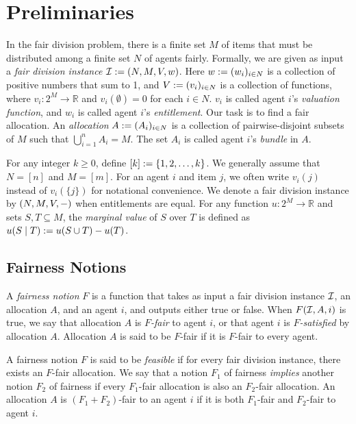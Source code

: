 \section{Preliminaries}
\label{sec:prelims}

In the fair division problem, there is a finite set $M$ of items
that must be distributed among a finite set $N$ of agents fairly.
Formally, we are given as input a \emph{fair division instance} $\mathcal{I} := (N,\allowbreak M,\allowbreak V,\allowbreak w)$.
Here $w := (w_i)_{i \in N}$ is a collection of positive numbers that sum to 1,
and $V := (v_i)_{i \in N}$ is a collection of functions,
where $v_i: 2^M \to \mathbb{R}$ and $v_i(\emptyset) = 0$ for each $i \in N$.
$v_i$ is called agent $i$'s \emph{valuation function},
and $w_i$ is called agent $i$'s \emph{entitlement}.
%
Our task is to find a fair allocation. An \emph{allocation} $A := (A_i)_{i \in N}$ is
a collection of pairwise-disjoint subsets of $M$ such that $\bigcup_{i=1}^n A_i = M$.
The set $A_i$ is called agent $i$'s \emph{bundle} in $A$.

For any integer $k \ge 0$, define $[k] := \{1, 2, \ldots, k\}$.
We generally assume \wLoG{} that $N = [n]$ and $M = [m]$.
For an agent $i$ and item $j$, we often write $v_i(j)$ instead of $v_i(\{j\})$ for notational convenience.
We denote a fair division instance by $(N,\allowbreak M,\allowbreak V,\allowbreak -)$ when entitlements are equal.
For any function $u: 2^M \to \mathbb{R}$ and sets $S, T \subseteq M$, the \emph{marginal value}
of $S$ over $T$ is defined as $u(S \mid T) := u(S \cup T) - u(T)$.

\subsection{Fairness Notions}
\label{sec:prelims:fairness-notions}

A \emph{fairness notion} $F$ is a function that takes as input a fair division instance $\mathcal{I}$,
an allocation $A$, and an agent $i$, and outputs either true or false.
When $F(\mathcal{I}, A, i)$ is true, we say that allocation $A$ is $F$\emph{-fair} to agent $i$,
or that agent $i$ is $F$\emph{-satisfied} by allocation $A$.
Allocation $A$ is said to be $F$-fair if it is $F$-fair to every agent.

A fairness notion $F$ is said to be \emph{feasible} if for every fair division instance,
there exists an $F$-fair allocation.
We say that a notion $F_1$ of fairness \emph{implies} another notion $F_2$ of fairness if
every $F_1$-fair allocation is also an $F_2$-fair allocation.
An allocation $A$ is $(F_1+F_2)$-fair to an agent $i$ if it is both $F_1$-fair
and $F_2$-fair to agent $i$.

